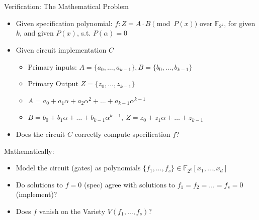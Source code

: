 \documentclass[xcolor=dvipsnames]{beamer}
\begin{document}

\begin{frame}{\large {Verification: The Mathematical Problem}}

\begin{itemize}
\item Given \alert{specification polynomial}: $f: Z = A\cdot B \pmod{ P(x)}$
   over $\mathbb{F}_{2^k}$, for given $k$, and given $P(x)$,
   s.t. $P(\alpha) = 0$
\item Given \alert{circuit implementation} $C$
 \begin{itemize}
 \item Primary inputs: $A = \{a_0, \dots, a_{k-1}\}, B = \{b_0,
   \dots, b_{k-1}\}$
 \item Primary Output $Z = \{z_0, \dots, z_{k-1}\}$
 \item $A = a_0 + a_1 \alpha + a_2\alpha^2 + \dots + a_{k-1} \alpha^{k-1}$
 \item $  B = b_0 + b_1 \alpha + \dots + b_{k-1} \alpha^{k-1}, 
       ~Z = z_0 + z_1 \alpha + \dots + z_{k-1}$
 \end{itemize}
\item Does the circuit $C$ correctly compute specification $f$?
\end{itemize}

Mathematically:
\begin{itemize}
\item Model the circuit (gates) as polynomials $\{f_1, \dots, f_s\}
  \in \mathbb{F}_{2^k}[x_1, \dots, x_d]$
\item Do solutions to $f = 0$ (\alert{spec}) agree with solutions to
  $f_1 = f_2 = \dots = f_s = 0$ (\alert{implement})?
\item Does $f$ \alert{vanish} on the \alert{Variety} $V(f_1, \dots, f_s)$?
\end{itemize}


\end{frame}
\end{document}
